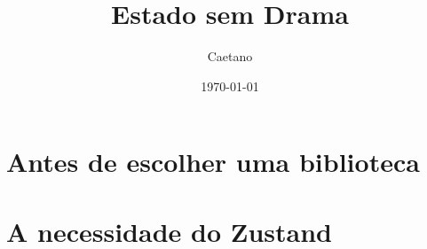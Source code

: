 \documentclass[10pt,twoside,openright]{book}
\title{Estado sem Drama}
\author{Caetano}
\date{\today}
\begin{document}
\frontmatter


\tableofcontents



\mainmatter
\part{Antes de escolher uma biblioteca}




\part{A necessidade do Zustand}







\backmatter


% 
% 
% 
% 
% 
% 
% 
% 

% 
% 
\end{document}
